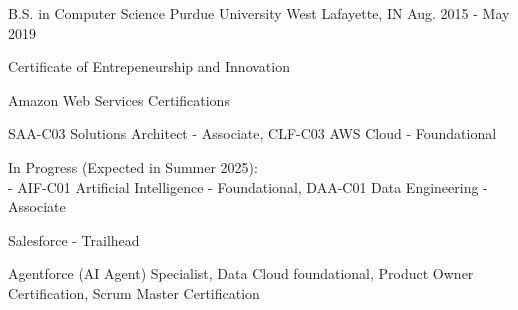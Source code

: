 

\begin{cventries}
  \cventry
    {B.S. in Computer Science} %
    {Purdue University} %
    {West Lafayette, IN} %
    {Aug. 2015 - May 2019} %
    {
      \begin{cvitems} %
        \item {Certificate of Entrepeneurship and Innovation}
      \end{cvitems}
    }

  \cventry
    {Amazon Web Services} %
    {Certifications} %
    {} %
    {} %
    {
      \begin{cvitems} %
        \item {SAA-C03 Solutions Architect - Associate, CLF-C03 AWS Cloud - Foundational}
        \item {In Progress (Expected in Summer 2025): \\ - AIF-C01 Artificial Intelligence - Foundational, DAA-C01 Data Engineering - Associate}
      \end{cvitems}
    }
    \newline
  \cventry
    {Salesforce - Trailhead} %
    {} %
    {} %
    {} %
    {
      \begin{cvitems} %
        \item {Agentforce (AI Agent) Specialist, Data Cloud  foundational, Product Owner Certification, Scrum Master Certification}
      \end{cvitems}
    }    
    \newline
\end{cventries}
